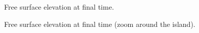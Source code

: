 \begin{figure}[H]
 \centering
 \caption{Free surface elevation at final time.}
 \label{fig:shoal:FreeSurface}
\end{figure}

\begin{figure}[H]
 \centering
 \caption{Free surface elevation at final time (zoom around the island).}
 \label{fig:shoal:FreeSurfaceZoom}
\end{figure}

